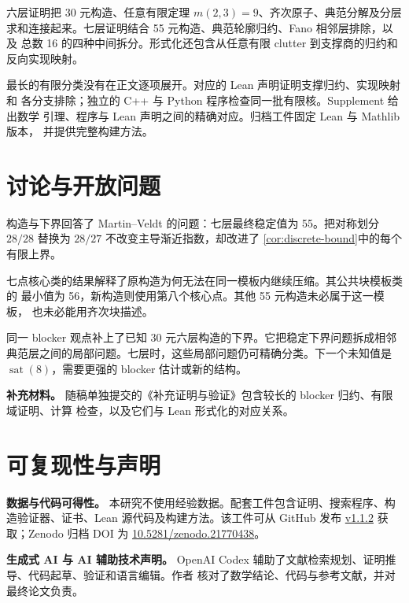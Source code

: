 \documentclass[UTF8,11pt,a4paper,fontset=fandol]{ctexart}
\theoremstyle{definition}
\theoremstyle{remark}
\newcommand{\sat}{\operatorname{sat}}
\begin{document}
六层证明把 30 元构造、任意有限定理 $m(2,3)=9$、齐次原子、典范分解及分层
求和连接起来。七层证明结合 55 元构造、典范轮廓归约、Fano 相邻层排除，以及
总数 16 的四种中间拆分。形式化还包含从任意有限 clutter 到支撑商的归约和
反向实现映射。

最长的有限分类没有在正文逐项展开。对应的 Lean 声明证明支撑归约、实现映射和
各分支排除；独立的 C++ 与 Python 程序检查同一批有限核。Supplement 给出数学
引理、程序与 Lean 声明之间的精确对应。归档工件固定 Lean 与 Mathlib 版本，
并提供完整构建方法。

\section{讨论与开放问题}

构造与下界回答了 Martin--Veldt 的问题：七层最终稳定值为 55。把对称划分
$28/28$ 替换为 $28/27$ 不改变主导渐近指数，却改进了
\cref{cor:discrete-bound}中的每个有限上界。

七点核心类的结果解释了原构造为何无法在同一模板内继续压缩。其公共块模板类的
最小值为 56，新构造则使用第八个核心点。其他 55 元构造未必属于这一模板，
也未必能用齐次块描述。

同一 blocker 观点补上了已知 30 元六层构造的下界。它把稳定下界问题拆成相邻
典范层之间的局部问题。七层时，这些局部问题仍可精确分类。下一个未知值是
$\sat(8)$，需要更强的 blocker 估计或新的结构。

\par\medskip\noindent\textbf{补充材料。}\quad
随稿单独提交的《补充证明与验证》包含较长的 blocker 归约、有限域证明、计算
检查，以及它们与 Lean 形式化的对应关系。

\section*{可复现性与声明}

\par\medskip\noindent\textbf{数据与代码可得性。}\quad
本研究不使用经验数据。配套工件包含证明、搜索程序、构造验证器、证书、Lean
源代码及构建方法。该工件可从 GitHub 发布
\href{https://github.com/lailai0916/saturated-sperner-6-7/releases/tag/v1.1.2}
{v1.1.2} 获取；Zenodo 归档 DOI 为
\href{https://doi.org/10.5281/zenodo.21770438}{10.5281/zenodo.21770438}。

\par\medskip\noindent\textbf{生成式 AI 与 AI 辅助技术声明。}\quad
OpenAI Codex 辅助了文献检索规划、证明推导、代码起草、验证和语言编辑。作者
核对了数学结论、代码与参考文献，并对最终论文负责。
\end{document}
